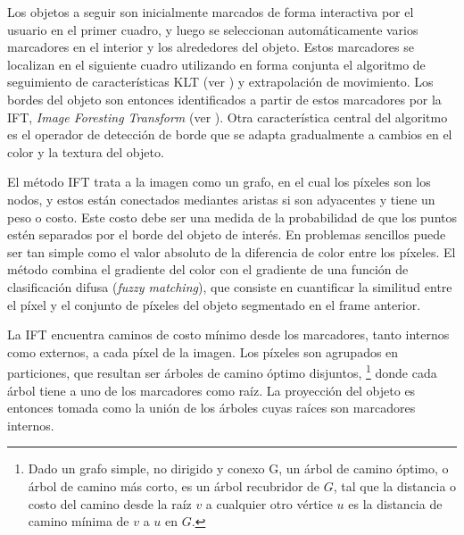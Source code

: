 \documentclass[a4paper,10pt]{article}
\begin{document}
Los objetos a seguir son inicialmente marcados de forma interactiva por el
usuario en el primer cuadro, y luego se seleccionan automáticamente varios
marcadores en el interior y los alrededores del objeto. Estos marcadores se
localizan en el siguiente cuadro utilizando en forma conjunta el algoritmo de
seguimiento de características KLT (ver \cite{KLT}) y extrapolación de
movimiento. Los bordes del objeto son entonces identificados a partir de estos
marcadores por la IFT, \textit{Image Foresting Transform} (ver \cite{IFT}).
Otra característica central del algoritmo es el operador de detección de borde
que se adapta gradualmente a cambios en el color y la textura del objeto.

El método IFT trata a la imagen como un grafo, en el cual los píxeles son los
nodos, y estos están conectados mediantes aristas si son adyacentes y tiene un
peso o costo. Este costo debe ser una medida de la probabilidad de que los
puntos estén separados por el borde del objeto de interés. En problemas
sencillos puede ser tan simple como el valor absoluto de la diferencia de color
entre los píxeles. El método combina el gradiente del color con el gradiente de
una función de clasificación difusa (\textit{fuzzy matching}), que consiste en
cuantificar la similitud entre el píxel y el conjunto de píxeles del objeto
segmentado en el frame anterior.

La IFT encuentra caminos de costo mínimo desde los marcadores, tanto internos
como externos, a cada píxel de la imagen. Los píxeles son agrupados en
particiones, que resultan ser árboles de camino óptimo disjuntos,
\footnote{Dado un grafo simple, no dirigido y conexo G, un árbol de camino
  óptimo, o árbol de camino más corto, es un árbol recubridor de $G$, tal que
  la distancia o costo del camino desde la raíz $v$ a cualquier otro vértice
$u$ es la distancia de camino mínima de $v$ a $u$ en $G$.} donde cada árbol
tiene a uno de los marcadores como raíz. La proyección del objeto es entonces
tomada como la unión de los árboles cuyas raíces son marcadores internos.
\end{document}

